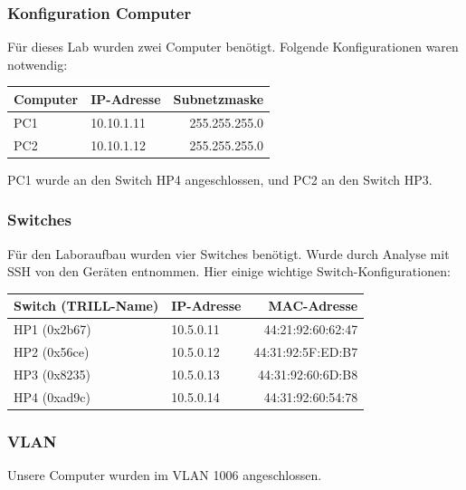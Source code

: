 \documentclass[a4,12pt]{scrartcl}
\begin{document}
\subsubsection{Konfiguration Computer}
Für dieses Lab wurden zwei Computer benötigt. Folgende Konfigurationen waren notwendig: 
\begin{center}
    \begin{tabular}{@{} l l r@{}}\toprule    
    {Computer} & {IP-Adresse} & {Subnetzmaske}\\ \midrule
    PC1 & 10.10.1.11 & 255.255.255.0\\ \addlinespace
    PC2 & 10.10.1.12 & 255.255.255.0\\ 
    \bottomrule
    \end{tabular}
\end{center}

\noindent PC1 wurde an den Switch HP4 angeschlossen, und PC2 an den Switch HP3. 

\subsubsection{Switches}
Für den Laboraufbau wurden vier Switches benötigt. Wurde durch Analyse mit SSH von den Geräten entnommen. Hier einige wichtige Switch-Konfigurationen: 
\begin{center}
    \begin{tabular}{@{} l l r@{}}\toprule    
    {Switch (TRILL-Name)} & {IP-Adresse} & {MAC-Adresse}\\ \midrule
    HP1 (0x2b67) & 10.5.0.11 & 44:21:92:60:62:47\\ \addlinespace
    HP2 (0x56ce) & 10.5.0.12 & 44:31:92:5F:ED:B7\\ \addlinespace
    HP3 (0x8235) & 10.5.0.13 & 44:31:92:60:6D:B8\\ \addlinespace
    HP4 (0xad9c) & 10.5.0.14 & 44:31:92:60:54:78\\
    \bottomrule
    \end{tabular}
\end{center}

\subsubsection{VLAN}
Unsere Computer wurden im VLAN 1006 angeschlossen. 
\end{document}
